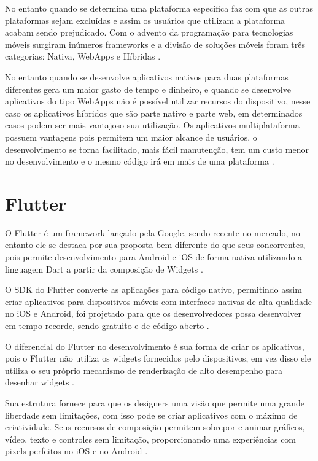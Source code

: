 \documentclass{ifto-tex}
\begin{document}
	No entanto quando se determina uma plataforma específica faz com que as outras plataformas sejam excluídas e assim os usuários que utilizam a plataforma acabam sendo prejudicado.
	Com o advento da programação para tecnologias móveis surgiram inúmeros frameworks e a divisão de soluções móveis foram três categorias: Nativa, WebApps e Híbridas \cite{Desenvol53:online}.
	
	No entanto quando se desenvolve aplicativos nativos para duas plataformas diferentes gera um maior gasto de tempo e dinheiro, e quando se desenvolve aplicativos do tipo WebApps não é possível utilizar recursos do dispositivo, nesse caso os aplicativos híbridos que são parte nativo e parte web, em determinados casos podem ser mais vantajoso sua utilização.
	Os aplicativos multiplataforma possuem vantagens pois permitem um maior alcance de usuários, o desenvolvimento se torna facilitado, mais fácil manutenção, tem um custo menor no desenvolvimento e o mesmo código irá em mais de uma plataforma \cite{Benefits70:online}.
	
	
	\section{Flutter}
O Flutter é um framework lançado pela Google, sendo recente no mercado, no entanto ele se destaca por sua proposta bem diferente do que seus concorrentes, pois permite desenvolvimento para Android e iOS de forma nativa utilizando a linguagem Dart a partir da composição de Widgets \cite{Conhecen37:online}.

O SDK do Flutter converte as aplicações para código nativo, permitindo assim criar aplicativos para dispositivos móveis com interfaces nativas de alta qualidade no iOS e Android, foi projetado para que os desenvolvedores possa desenvolver em tempo recorde, sendo gratuito e de código aberto \cite{flutterf54:online}.

O diferencial do Flutter no desenvolvimento é sua forma de criar os aplicativos, pois o Flutter não utiliza os widgets fornecidos pelo dispositivos, em vez disso ele utiliza o seu próprio mecanismo de renderização de alto desempenho para desenhar widgets \cite{corazza2018aplicativo}.

Sua estrutura fornece para que os designers uma visão que permite uma grande liberdade sem limitações, com isso pode se criar aplicativos com o máximo de criatividade. Seus recursos de composição permitem sobrepor e animar gráficos, vídeo, texto e controles sem limitação, proporcionando uma experiências com pixels perfeitos no iOS e no Android \cite{flutterf54:online}.
\end{document}
